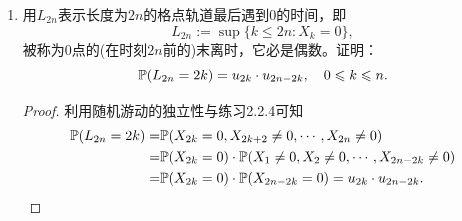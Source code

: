 \begin{enumerate}
\begin{proof}
        利用上述两个等式可知$\P(X_1\neq0,X_2\neq0,\cdots,X_{2n}\neq0)=\P(X_{2n}=0)$，从而
        \[\P(T=2n)=\P(X_1\neq0,X_2\neq0,\cdots,X_{2n-2}\neq0,X_{2n}=0)=\P(X_{2n-2}=0)-\P(X_{2n}=0)=u_{2n-2}-u_{2n}.\]
    \end{proof}
    \item[2.2.10] 用$L_{2n}$表示长度为$2n$的格点轨道最后遇到$0$的时间，即\[L_{2n}:=\sup\{k\leqslant2n:X_k=0\},\]
    被称为$0$点的(在时刻$2n$前的)末离时，它必是偶数。证明：\[\P(L_{2n}=2k)=u_{2k}\cdot u_{2n-2k},\quad0\leqslant k\leqslant n.\]
    \begin{proof}
        利用随机游动的独立性与练习2.2.4可知
        \begin{align*}
            \P(L_{2n}=2k)=&\P(X_{2k}=0,X_{2k+2}\neq0,\cdots,X_{2n}\neq0)\\
            =&\P(X_{2k}=0)\cdot\P(X_1\neq0,X_2\neq0,\cdots,X_{2n-2k}\neq0)\\
            =&\P(X_{2k}=0)\cdot\P(X_{2n-2k}=0)=u_{2k}\cdot u_{2n-2k}.
        \end{align*}
    \end{proof}
\end{enumerate}

